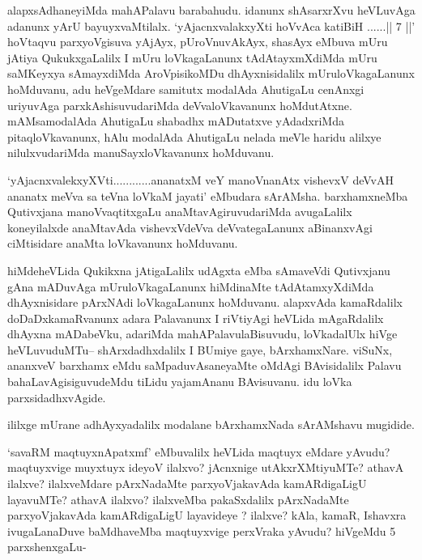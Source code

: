 \begin{artha}
alapxsAdhaneyiMda mahAPalavu barabahudu. idanunx shAsarxrXvu heVLuvAga adanunx yArU bayuyxvaMtilalx. `yAjacnxvalakxyXti hoVvAca katiBiH ......|| 7 ||' hoVtaqvu parxyoVgisuva yAjAyx, pUroVnuvAkAyx, shasAyx eMbuva mUru jAtiya QukukxgaLalilx I mUru loVkagaLanunx tAdAtayxmXdiMda  mUru saMKeyxya sAmayxdiMda AroVpisikoMDu dhAyxnisidalilx mUruloVkagaLanunx hoMduvanu, adu heVgeMdare samitutx modalAda AhutigaLu cenAnxgi uriyuvAga parxkAshisuvudariMda deVvaloVkavanunx hoMdutAtxne. mAMsamodalAda AhutigaLu shabadhx mADutatxve yAdadxriMda pitaqloVkavanunx, hAlu modalAda AhutigaLu nelada meVle haridu alilxye nilulxvudariMda manuSayxloVkavanunx hoMduvanu.

`yAjacnxvalekxyXVti............ananatxM veY manoV\s nanAtx vishevxV deVvAH ananatx meVva sa teVna loVkaM jayati' eMbudara sArAMsha. barxhamxneMba Qutivxjana manoVvaqtitxgaLu 
anaMtavAgiruvudariMda avugaLalilx koneyilalxde anaMtavAda vishevxVdeVva deVvategaLanunx 
aBinanxvAgi ciMtisidare anaMta loVkavanunx hoMduvanu.
\end{artha}

\centerline{}

\begin{artha}
hiMdeheVLida  Qukikxna jAtigaLalilx udAgxta eMba sAmaveVdi Qutivxjanu  gAna mADuvAga mUruloVkagaLanunx hiMdinaMte tAdAtamxyXdiMda dhAyxnisidare pArxNAdi loVkagaLanunx hoMduvanu. alapxvAda kamaRdalilx doDaDxkamaRvanunx adara Palavanunx I riVtiyAgi heVLida mAgaRdalilx dhAyxna mADabeVku, adariMda mahAPalavulaBisuvudu, loVkadalUlx hiVge heVLuvuduMTu-- shArxdadhxdalilx I BUmiye gaye, bArxhamxNare. viSuNx, ananxveV barxhamx eMdu saMpaduvAsaneyaMte oMdAgi BAvisidalilx Palavu bahaLavAgisiguvudeMdu tiLidu yajamAnanu BAvisuvanu. idu loVka parxsidadhxvAgide.
\end{artha}

\begin{artha}ililxge mUrane adhAyxyadalilx modalane bArxhamxNada sArAMshavu mugidide.\end{artha}


\begin{artha}
`savaRM maqtuyxnA\s \s patxmf' eMbuvalilx heVLida maqtuyx eMdare yAvudu? maqtuyxvige muyxtuyx ideyoV ilalxvo? jAcnxnige  utAkxrXMtiyuMTe? athavA ilalxve? ilalxveMdare pArxNadaMte parxyoVjakavAda kamARdigaLigU layavuMTe? athavA ilalxvo? ilalxveMba pakaSxdalilx pArxNadaMte parxyoVjakavAda kamARdigaLigU layavideye ? ilalxve?  kAla, kamaR, Ishavxra ivugaLanaDuve baMdhaveMba maqtuyxvige perxVraka yAvudu? hiVgeMdu 5 parxshenxgaLu-
\end{artha}

